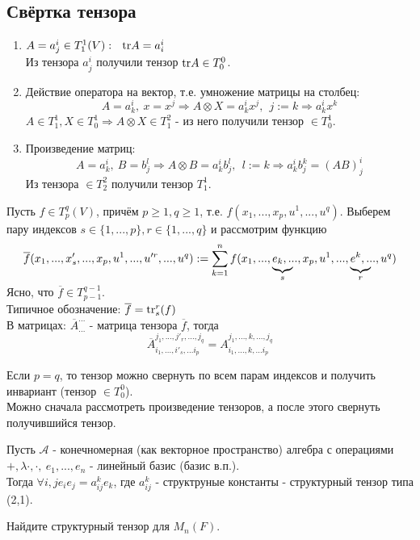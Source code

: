 \subsection{Свёртка тензора}
\begin{example}
    \begin{enumerate}
        \item $A = a^i_j \in T_1^1(V): \ \ \textup{tr} A = a_i^i$\\
        Из тензора $a^i_j$ получили тензор $\textup{tr} A \in T_0^0$.
        \item Действие оператора на вектор, т.е. умножение матрицы на столбец:
        \[A = a^i_k, \ x = x^j \Longrightarrow A \otimes X = a^i_kx^j, \ \ j := k \Longrightarrow a^i_kx^k\]
        $A \in T_1^1, X \in T^1_0 \Longrightarrow A \otimes X \in T^2_1$ - из него получили тензор $\in T^1_0$.
        \item Произведение матриц:
        \[A = a^i_k, \ B = b^l_j \Longrightarrow A \otimes B = a^i_kb^l_j, \ \ l := k \Longrightarrow a^i_kb^k_j = (AB)^i_j\]
        Из тензора $\in T^2_2$ получили тензор $T^1_1$.
    \end{enumerate}
\end{example}
\begin{definition}
    Пусть $f \in T^q_p(V)$, причём $p \geqslant 1, q \geqslant 1$, т.е. $f(x_1,...,x_p, u^1,...,u^q)$. Выберем пару индексов $s \in \{1,...,p\}, r\in \{1,...,q\}$ и рассмотрим функцию 
    \[\overline{f}(x_1,...,x'_s,...,x_p,u^1,...,u'^r,...,u^q) := \sum \limits_{k=1}^n f(x_1,...,\undermat{s}{e}_k,...,x_p,u^1,...,\undermat{r}{e}^k,...,u^q)\] 
    Ясно, что $\overline{f} \in T^{q-1}_{p-1}$.\\
    Типичное обозначение: $\overline{f} = \textup{tr}_s^r(f)$\\
    В матрицах: $\overline{A}_{...}^{...}$ - матрица тензора $\overline{f}$, тогда
    \[\overline{A}_{i_1,...,i'_s,...i_p}^{j_1,...,j'_r,...,j_q} = A_{i_1,...,k,...i_p}^{j_1,...,k,...,j_q}\]
\end{definition}
Если $p=q$, то тензор можно свернуть по всем парам индексов и получить инвариант (тензор $\in T_0^0$).\\
Можно сначала рассмотреть произведение тензоров, а после этого свернуть получившийся тензор.
\begin{example1}
    Пусть $\mathcal{A}$ - конечномерная (как векторное пространство) алгебра с операциями $+, \lambda\cdot, \cdot, \ e_1,...,e_n$ - линейный базис (базис в.п.).\\
    Тогда $\forall i,j e_ie_j = a_{ij}^ke_k$, где $a_{ij}^k$ - структруные константы - структурный тензор типа (2,1).
\end{example1}
\begin{exercise}
    Найдите структурный тензор для $M_n(F)$.
\end{exercise}
